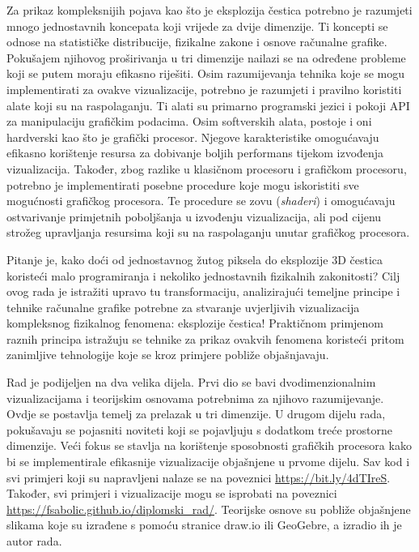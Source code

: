 \documentclass{foi}
\begin{document}
Za prikaz kompleksnijih pojava kao što je eksplozija čestica potrebno je razumjeti mnogo jednostavnih koncepata koji vrijede za dvije dimenzije. Ti koncepti se odnose na statističke distribucije, fizikalne zakone i osnove računalne grafike. Pokušajem njihovog proširivanja u tri dimenzije nailazi se na određene probleme koji se putem moraju efikasno riješiti. Osim razumijevanja tehnika koje se mogu implementirati za ovakve vizualizacije, potrebno je razumjeti i pravilno koristiti alate koji su na raspolaganju. Ti alati su primarno programski jezici i pokoji API za manipulaciju grafičkim podacima. Osim softverskih alata, postoje i oni hardverski kao što je grafički procesor. Njegove karakteristike omogućavaju efikasno korištenje resursa za dobivanje boljih performans tijekom izvođenja vizualizacija. Također, zbog razlike u klasičnom procesoru i grafičkom procesoru, potrebno je implementirati posebne procedure koje mogu iskoristiti sve mogućnosti grafičkog procesora. Te procedure se zovu (\textit{shaderi}) i omogućavaju ostvarivanje primjetnih poboljšanja u izvođenju vizualizacija, ali pod cijenu strožeg upravljanja resursima koji su na raspolaganju unutar grafičkog procesora.

Pitanje je, kako doći od jednostavnog žutog piksela do eksplozije 3D čestica koristeći malo programiranja i nekoliko jednostavnih fizikalnih zakonitosti? Cilj ovog rada je istražiti upravo tu transformaciju, analizirajući temeljne principe i tehnike računalne grafike potrebne za stvaranje uvjerljivih vizualizacija kompleksnog fizikalnog fenomena: eksplozije čestica! Praktičnom primjenom raznih principa istražuju se tehnike za prikaz ovakvih fenomena koristeći pritom zanimljive tehnologije koje se kroz primjere pobliže objašnjavaju. 

Rad je podijeljen na dva velika dijela. Prvi dio se bavi dvodimenzionalnim vizualizacijama i teorijskim osnovama potrebnima za njihovo razumijevanje. Ovdje se postavlja temelj za prelazak u tri dimenzije. U drugom dijelu rada, pokušavaju se pojasniti noviteti koji se pojavljuju s dodatkom treće prostorne dimenzije. Veći fokus se stavlja na korištenje sposobnosti grafičkih procesora kako bi se implementirale efikasnije vizualizacije objašnjene u prvome dijelu. Sav kod i svi primjeri koji su napravljeni nalaze se na poveznici \url{https://bit.ly/4dTIreS}. Također, svi primjeri i vizualizacije mogu se isprobati na poveznici \url{https://fsabolic.github.io/diplomski_rad/}. Teorijske osnove su pobliže objašnjene slikama koje su izrađene s pomoću stranice draw.io ili GeoGebre, a izradio ih je autor rada.
\end{document}
